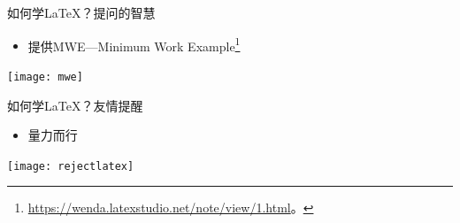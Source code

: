 \documentclass[fontset = none, xcolor=svgnames, t, aspectratio=169]{ctexbeamer}
\begin{document}
\begin{frame}{如何学\LaTeX ？}{提问的智慧}
  \stretchon
  \begin{itemize}
  \item 提供\alert{MWE}---Minimum Work Example\footnote[frame]{\href{https://wenda.latexstudio.net/note/view/1.html}{https://wenda.latexstudio.net/note/view/1.html}。}    
  \end{itemize}
  \centering
  \texttt{[image: mwe]}
  \stretchoff
\end{frame}

\begin{frame}{如何学\LaTeX ？}{友情提醒}
  \stretchon
  \begin{itemize}
  \item 量力而行    
  \end{itemize}
  \centering
  \texttt{[image: rejectlatex]}
  \stretchoff
\end{frame}
\end{document}
